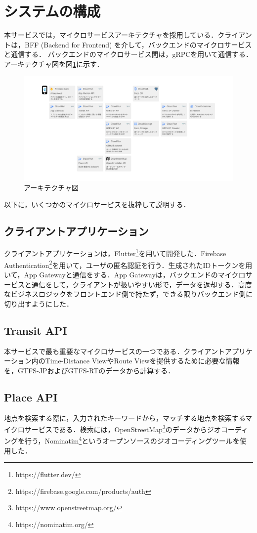 \section{システムの構成}
本サービスでは，マイクロサービスアーキテクチャを採用している．クライアントは，BFF (Backend for Frontend) を介して，バックエンドのマイクロサービスと通信する．
バックエンドのマイクロサービス間は，gRPCを用いて通信する．アーキテクチャ図を図\ref{fig:architecture}に示す．
\begin{figure}[H]
    \centering
    \includegraphics[width=14cm]{images/architecture_diagram.png}
    \caption{アーキテクチャ図}
    \label{fig:architecture}
\end{figure}
以下に，いくつかのマイクロサービスを抜粋して説明する．

\subsection{クライアントアプリケーション}
クライアントアプリケーションは，Flutter\footnote{https://flutter.dev/}を用いて開発した．Firebase Authentication\footnote{https://firebase.google.com/products/auth}を用いて，ユーザの匿名認証を行う．生成されたIDトークンを用いて，App Gatewayと通信をする．App Gatewayは，バックエンドのマイクロサービスと通信をして，クライアントが扱いやすい形で，データを返却する．高度なビジネスロジックをフロントエンド側で持たず，できる限りバックエンド側に切り出すようにした．

\subsection{Transit API}
本サービスで最も重要なマイクロサービスの一つである．クライアントアプリケーション内のTime-Distance ViewやRoute Viewを提供するために必要な情報を，GTFS-JPおよびGTFS-RTのデータから計算する．

\subsection{Place API}
地点を検索する際に，入力されたキーワードから，マッチする地点を検索するマイクロサービスである．検索には，OpenStreetMap\footnote{https://www.openstreetmap.org/}のデータからジオコーディングを行う，Nominatim\footnote{https://nominatim.org/}というオープンソースのジオコーディングツールを使用した．
